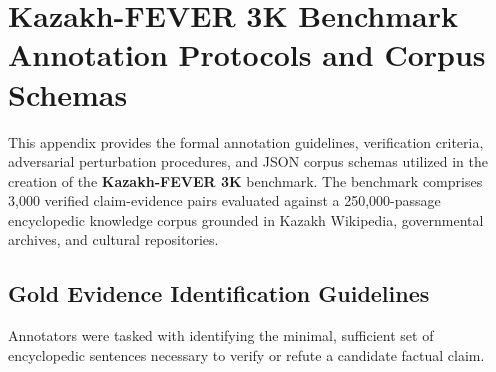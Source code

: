 \chapter{Kazakh-FEVER 3K Benchmark Annotation Protocols and Corpus Schemas}
\label{app:fever_annotation}

This appendix provides the formal annotation guidelines, verification criteria, adversarial perturbation procedures, and JSON corpus schemas utilized in the creation of the \textbf{Kazakh-FEVER 3K} benchmark. The benchmark comprises 3,000 verified claim-evidence pairs evaluated against a 250,000-passage encyclopedic knowledge corpus grounded in Kazakh Wikipedia, governmental archives, and cultural repositories.

\section{Gold Evidence Identification Guidelines}
\label{sec:app_fever_evidence_guidelines}

Annotators were tasked with identifying the minimal, sufficient set of encyclopedic sentences necessary to verify or refute a candidate factual claim.

